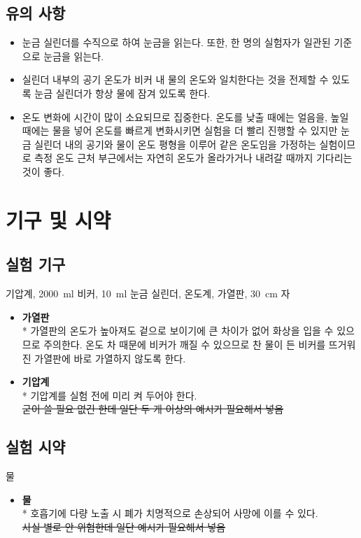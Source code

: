 \documentclass[a4paper,10pt]{article}
\begin{document}
	\subsection{유의 사항}
	\begin{itemize}
		\item 눈금 실린더를 수직으로 하여 눈금을 읽는다. 또한, 한 명의 실험자가 일관된 기준으로 눈금을 읽는다.
		\item 실린더 내부의 공기 온도가 비커 내 물의 온도와 일치한다는 것을 전제할 수 있도록 눈금 실린더가 항상 물에 잠겨 있도록 한다.
		\item 온도 변화에 시간이 많이 소요되므로 집중한다. 온도를 낮출 때에는 얼음을, 높일 때에는 물을 넣어 온도를 빠르게 변화시키면 실험을 더 빨리 진행할 수 있지만 눈금 실린더 내의 공기와 물이 온도 평형을 이루어 같은 온도임을 가정하는 실험이므로 측정 온도 근처 부근에서는 자연히 온도가 올라가거나 내려갈 때까지 기다리는 것이 좋다.
	\end{itemize}
	
	\section{기구 및 시약}
	
	\subsection{실험 기구}
	기압계, \SI{2000}{\milli\litre} 비커, \SI{10}{\milli\litre} 눈금 실린더, 온도계, 가열판, \SI{30}{\centi\metre} 자
	\begin{itemize}
		\item {\bf 가열판} \\*
		가열판의 온도가 높아져도 겉으로 보이기에 큰 차이가 없어 화상을 입을 수 있으므로 주의한다. 온도 차 때문에 비커가 깨질 수 있으므로 찬 물이 든 비커를 뜨거워진 가열판에 바로 가열하지 않도록 한다.
		\item {\bf 기압계} \\*
		기압계를 실험 전에 미리 켜 두어야 한다. \\
		\sout{굳이 쓸 필요 없긴 한데 일단 두 개 이상의 예시가 필요해서 넣음}
	\end{itemize}
	\subsection{실험 시약}
	물
	\begin{itemize}
		\item {\bf 물} \\*
		호흡기에 다량 노출 시 폐가 치명적으로 손상되어 사망에 이를 수 있다. \\
		\sout{사실 별로 안 위험한데 일단 예시가 필요해서 넣음}
	\end{itemize}
	
\end{document}
